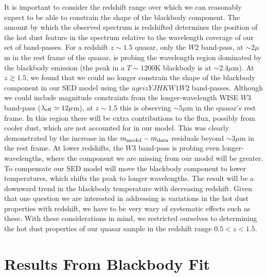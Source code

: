 It is important to consider the redshift range over which we can reasonably expect to be able to constrain the shape of the blackbody component. The amount by which the observed spectrum is redshifted determines the position of the hot dust feature in the spectrum relative to the wavelength coverage of our set of band-passes. For a redshift $z \sim 1.5$ quasar, only the $W2$ band-pass, at $\sim 2 \mu$m in the rest frame of the quasar, is probing the wavelength region dominated by the blackbody emission (the peak in a $T \sim 1200$K blackbody is at $\sim 2.4 \mu$m). At $z \gtrsim 1.5$, we found that we could no longer constrain the shape of the blackbody component in our SED model using the $ugrizYJHKW1W2$ band-passes. Although we could include magnitude constraints from the longer-wavelength WISE $W3$ band-pass ($\lambda_{\rm eff} \simeq 12 \mu$m), at $z \sim 1.5$ this is observing $\sim 5 \mu$m in the quasar's rest frame. In this region there will be extra contributions to the flux, possibly from cooler dust, which are not accounted for in our model. This was clearly demonstrated by the increase in the $m_{\rm model} - m_{\rm data}$ residuals beyond $\sim 3\mu$m in the rest frame. At lower redshifts, the $W3$ band-pass is probing even longer-wavelengths, where the component we are missing from our model will be greater. To compensate our SED model will move the blackbody component to lower temperatures, which shifts the peak to longer wavelengths. The result will be a downward trend in the blackbody temperature with decreasing redshift. Given that one question we are interested in addressing is variations in the hot dust properties with redshift, we have to be very wary of systematic effects such as these. With these considerations in mind, we restricted ourselves to determining the hot dust properties of our quasar sample in the redshift range $0.5 < z < 1.5$. 

 

\section{Results From Blackbody Fit}

